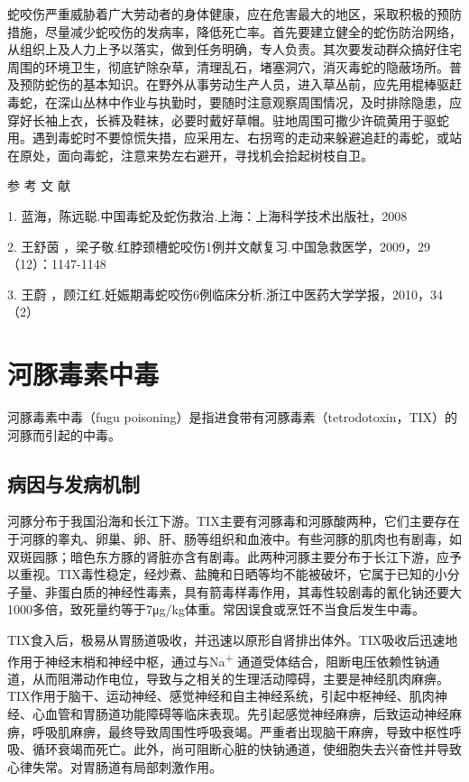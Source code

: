 蛇咬伤严重威胁着广大劳动者的身体健康，应在危害最大的地区，采取积极的预防措施，尽量减少蛇咬伤的发病率，降低死亡率。首先要建立健全的蛇伤防治网络，从组织上及人力上予以落实，做到任务明确，专人负责。其次要发动群众搞好住宅周围的环境卫生，彻底铲除杂草，清理乱石，堵塞洞穴，消灭毒蛇的隐蔽场所。普及预防蛇伤的基本知识。在野外从事劳动生产人员，进入草丛前，应先用棍棒驱赶毒蛇，在深山丛林中作业与执勤时，要随时注意观察周围情况，及时排除隐患，应穿好长袖上衣，长裤及鞋袜，必要时戴好草帽。驻地周围可撒少许硫黄用于驱蛇用。遇到毒蛇时不要惊慌失措，应采用左、右拐弯的走动来躲避追赶的毒蛇，或站在原处，面向毒蛇，注意来势左右避开，寻找机会拾起树枝自卫。

\hypertarget{text00172.htmlux5cux23CHP5-8-1-5}{}
参 考 文 献

1. 蓝海，陈远聪.中国毒蛇及蛇伤救治.上海：上海科学技术出版社，2008

2. 王舒茵
，梁子敬.红脖颈槽蛇咬伤1例并文献复习.中国急救医学，2009，29（12）：1147-1148

3. 王蔚
，顾江红.妊娠期毒蛇咬伤6例临床分析.浙江中医药大学学报，2010，34（2）

\protect\hypertarget{text00173.html}{}{}

\section{河豚毒素中毒}

河豚毒素中毒（fugu
poisoning）是指进食带有河豚毒素（tetrodotoxin，TIX）的河豚而引起的中毒。

\subsection{病因与发病机制}

河豚分布于我国沿海和长江下游。TIX主要有河豚毒和河豚酸两种，它们主要存在于河豚的睾丸、卵巢、卵、肝、肠等组织和血液中。有些河豚的肌肉也有剧毒，如双斑园豚；暗色东方豚的肾脏亦含有剧毒。此两种河豚主要分布于长江下游，应予以重视。TIX毒性稳定，经炒煮、盐腌和日晒等均不能被破坏，它属于已知的小分子量、非蛋白质的神经性毒素，具有箭毒样毒作用，其毒性较剧毒的氰化钠还要大1000多倍，致死量约等于7μg/kg体重。常因误食或烹饪不当食后发生中毒。

TIX食入后，极易从胃肠道吸收，并迅速以原形自肾排出体外。TIX吸收后迅速地作用于神经末梢和神经中枢，通过与Na\textsuperscript{+}
通道受体结合，阻断电压依赖性钠通道，从而阻滞动作电位，导致与之相关的生理活动障碍，主要是神经肌肉麻痹。TIX作用于脑干、运动神经、感觉神经和自主神经系统，引起中枢神经、肌肉神经、心血管和胃肠道功能障碍等临床表现。先引起感觉神经麻痹，后致运动神经麻痹，呼吸肌麻痹，最终导致周围性呼吸衰竭。严重者出现脑干麻痹，导致中枢性呼吸、循环衰竭而死亡。此外，尚可阻断心脏的快钠通道，使细胞失去兴奋性并导致心律失常。对胃肠道有局部刺激作用。

